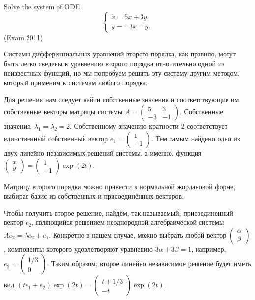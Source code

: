 \begin{problem}
Solve the system of ODE
\[
\begin{cases}
\dot{x}=5x+3y, \\
\dot{y}=-3x-y.
\end{cases}
\]
(Exam 2011)


\begin{sol}
Системы дифференциальных уравнений второго порядка, как правило, могут быть легко сведены к уравнению второго порядка относительно одной из неизвестных функций, но мы попробуем решить эту систему другим методом, который применим к системам любого порядка.

Для решения нам следует найти собственные значения и соответствующие им собственные векторы матрицы системы $A=\left(\begin{array}{cc} {5} & {3} \\ {-3} & {-1} \end{array}\right)$. Собственные значения, $\lambda _{1} =\lambda _{2} =2$. Собственному значению кратности 2 соответствует единственный собственный вектор $e_{1} =\left(\begin{array}{c} {1} \\ {-1} \end{array}\right)$. Тем самым найдено одно из двух линейно независимых решений системы, а именно, функция $\left(\begin{array}{c} {x} \\ {y} \end{array}\right)=\left(\begin{array}{c} {1} \\ {-1} \end{array}\right)\exp (2t)$.


Матрицу второго порядка можно привести к нормальной жордановой форме, выбирая базис из собственных и присоединённых векторов.


Чтобы получить второе решение, найдём, так называемый, присоединенный вектор $e_{2} $, являющийся решением неоднородной алгебраической системы $Ae_{2} =\lambda e_{2} +e_{1} $. Конкретно в нашем случае, можно выбрать любой вектор $\left(\begin{array}{c} {\alpha } \\ {\beta } \end{array}\right)$, компоненты которого удовлетворяют уравнению $3\alpha +3\beta =1$, например, $e_{2} =\left(\begin{array}{c} {1/3} \\ {0} \end{array}\right)$. Таким образом, второе линейно независимое решение будет иметь вид $(te_{1} +e_{2} )\exp (2t)=\left(\begin{array}{c} {t+1/3} \\ {-t} \end{array}\right)\exp (2t)$.


\end{sol}
\end{problem}
